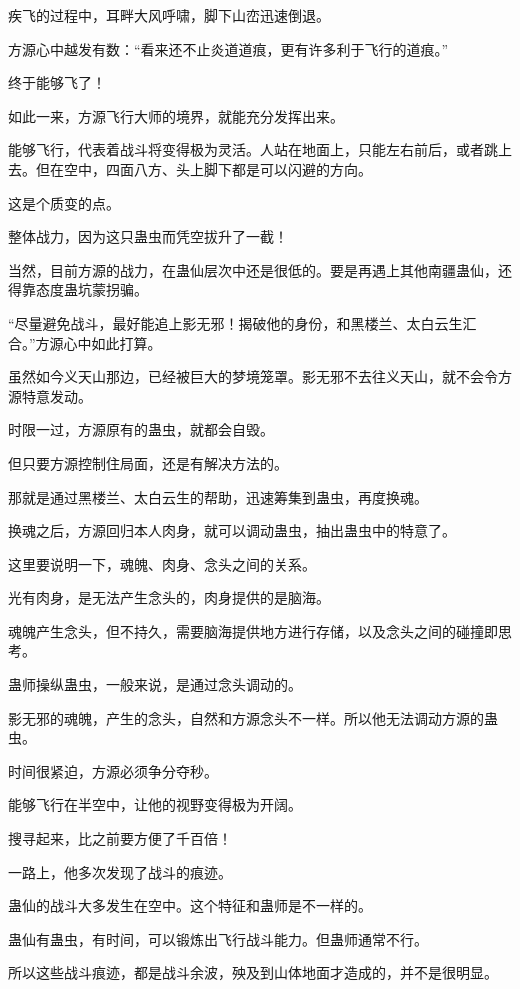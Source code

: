 \begin{this_body}
疾飞的过程中，耳畔大风呼啸，脚下山峦迅速倒退。

方源心中越发有数：“看来还不止炎道道痕，更有许多利于飞行的道痕。”

终于能够飞了！

如此一来，方源飞行大师的境界，就能充分发挥出来。

能够飞行，代表着战斗将变得极为灵活。人站在地面上，只能左右前后，或者跳上去。但在空中，四面八方、头上脚下都是可以闪避的方向。

这是个质变的点。

整体战力，因为这只蛊虫而凭空拔升了一截！

当然，目前方源的战力，在蛊仙层次中还是很低的。要是再遇上其他南疆蛊仙，还得靠态度蛊坑蒙拐骗。

“尽量避免战斗，最好能追上影无邪！揭破他的身份，和黑楼兰、太白云生汇合。”方源心中如此打算。

虽然如今义天山那边，已经被巨大的梦境笼罩。影无邪不去往义天山，就不会令方源特意发动。

时限一过，方源原有的蛊虫，就都会自毁。

但只要方源控制住局面，还是有解决方法的。

那就是通过黑楼兰、太白云生的帮助，迅速筹集到蛊虫，再度换魂。

换魂之后，方源回归本人肉身，就可以调动蛊虫，抽出蛊虫中的特意了。

这里要说明一下，魂魄、肉身、念头之间的关系。

光有肉身，是无法产生念头的，肉身提供的是脑海。

魂魄产生念头，但不持久，需要脑海提供地方进行存储，以及念头之间的碰撞即思考。

蛊师操纵蛊虫，一般来说，是通过念头调动的。

影无邪的魂魄，产生的念头，自然和方源念头不一样。所以他无法调动方源的蛊虫。

时间很紧迫，方源必须争分夺秒。

能够飞行在半空中，让他的视野变得极为开阔。

搜寻起来，比之前要方便了千百倍！

一路上，他多次发现了战斗的痕迹。

蛊仙的战斗大多发生在空中。这个特征和蛊师是不一样的。

蛊仙有蛊虫，有时间，可以锻炼出飞行战斗能力。但蛊师通常不行。

所以这些战斗痕迹，都是战斗余波，殃及到山体地面才造成的，并不是很明显。


\end{this_body}
